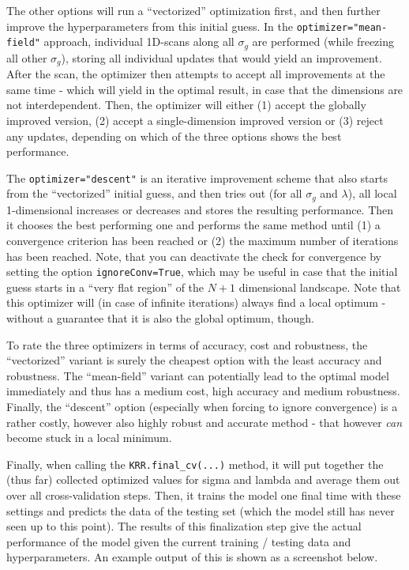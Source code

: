 \documentclass[12pt]{achemso}
\begin{document}
\noindent The other options will run a ``vectorized'' optimization first, and then further improve the hyperparameters from this initial guess. In the \texttt{optimizer="mean-field"} approach, individual 1D-scans along all $\sigma_g$ are performed (while freezing all other $\sigma_g$), storing all individual updates that would yield an improvement. After the scan, the optimizer then attempts to accept all improvements at the same time - which will yield in the optimal result, in case that the dimensions are not interdependent. Then, the optimizer will either (1) accept the globally improved version, (2) accept a single-dimension improved version or (3) reject any updates, depending on which of the three options shows the best performance.

\noindent The \texttt{optimizer="descent"} is an iterative improvement scheme that also starts from the ``vectorized'' initial guess, and then tries out (for all $\sigma_g$ and $\lambda$), all local 1-dimensional increases or decreases and stores the resulting performance. Then it chooses the best performing one and performs the same method until (1) a convergence criterion has been reached or (2) the maximum number of iterations has been reached. Note, that you can deactivate the check for convergence by setting the option \texttt{ignoreConv=True}, which may be useful in case that the initial guess starts in a ``very flat region'' of the $N+1$ dimensional landscape. Note that this optimizer will (in case of infinite iterations) always find a local optimum - without a guarantee that it is also the global optimum, though.

\noindent To rate the three optimizers in terms of accuracy, cost and robustness, the ``vectorized'' variant is surely the cheapest option with the least accuracy and robustness. The ``mean-field'' variant can potentially lead to the optimal model immediately and thus has a medium cost, high accuracy and medium robustness. Finally, the ``descent'' option (especially when forcing to ignore convergence) is a rather costly, however also highly robust and accurate method - that however \textit{can} become stuck in a local minimum.

\noindent Finally, when calling the \texttt{KRR.final\_cv(...)} method, it will put together the (thus far) collected optimized values for sigma and lambda and average them out over all cross-validation steps. Then, it trains the model one final time with these settings and predicts the data of the testing set (which the model still has never seen up to this point). The results of this finalization step give the actual performance of the model given the current training / testing data and hyperparameters. An example output of this is shown as a screenshot below.
\end{document}
